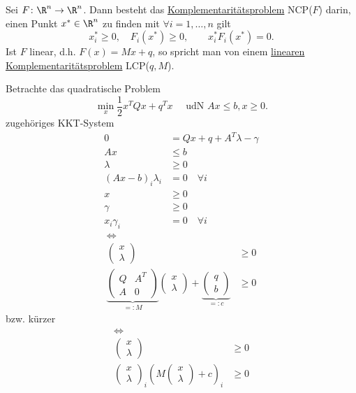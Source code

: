 \begin{definition}
\label{thm:komplementaritätsproblem}
Sei $F \colon \R^{n} \rightarrow \R^{n} $. Dann besteht das \underline{Komplementaritätsproblem}  NCP($F$) darin, einen Punkt ${x}^{*} \in \R^{n}$ zu finden mit $\forall i=1, \ldots, n$ gilt
\[
	x_{i}^{*} \geq  0,\quad F_{i}({x}^{*}) \geq 0, \qquad x_{i}^{*}F_{i}({x}^{*}) = 0
.\] 
Ist $F$ linear, d.h. $F(x) = Mx + q$, so spricht man von einem \underline{linearen Komplementaritätsproblem} LCP($q,M$).
\end{definition}

\begin{beisp}
\label{thm:komplementaritätsproblembeispiel}
	Betrachte das quadratische Problem
	\[
	\min\limits_{x}\frac{1}{2} x^{T} Q x + q^{T}x \quad \text{ udN } Ax \leq  b, x \geq  0
	.\] 
	zugehöriges KKT-System
	\begin{align*}
		0 &= Qx + q + A^{T} \lambda - \gamma  \\
		Ax &\leq  b \\
		\lambda &\geq  0 \\
		(Ax-b)_{i}\lambda _{i} &= 0 \quad \forall i \\
		x &\geq  0 \\
		\gamma &\geq  0 \\
		x_{i}\gamma_{i} &= 0 \quad \forall i
	\end{align*}
	\begin{align*}
		\iff\qquad\qquad\qquad\qquad\qquad &\\
	\begin{pmatrix}
	x \\
	\lambda 
\end{pmatrix} &\geq 0 \\
\underbrace{\begin{pmatrix}
		Q & A^{T} \\ A & 0
\end{pmatrix}
}_{=:M} \begin{pmatrix}
x \\ \lambda 
\end{pmatrix}
+ \underbrace{\begin{pmatrix}
q \\ b
\end{pmatrix}
}_{=:c} 
&\geq 0
	\end{align*}
	bzw. kürzer
	\begin{align*}
		\iff\qquad\qquad\qquad\qquad\qquad &\\
	\begin{pmatrix}
	x \\
	\lambda 
\end{pmatrix} &\geq 0 \\
\begin{pmatrix}
x \\ \lambda 
\end{pmatrix}
_{i}\left( M \begin{pmatrix}
x \\ \lambda 
\end{pmatrix}
	+ c \right) _{i} &\geq  0
	\end{align*}
\end{beisp}

